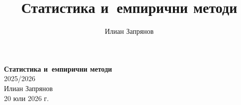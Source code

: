 \documentclass[11pt,a4paper]{book}
\title{\textcolor{ChapterAccent}{\Huge Статистика и~емпирични методи}}
\author{Илиан Запрянов}
\date{}
\begin{document}
\begin{titlepage}
\centering
\vspace*{3cm}
{\Huge\bfseries\color{ChapterAccent} Статистика и~емпирични методи}\\[0.5em]
{\Large\color{ChapterAccent!70!black} 2025/2026}\\[2cm]
{\large Илиан Запрянов}\\[2cm]
{\large 20 юли 2026 г.}
\vfill
\end{titlepage}

\tableofcontents




















\end{document}
